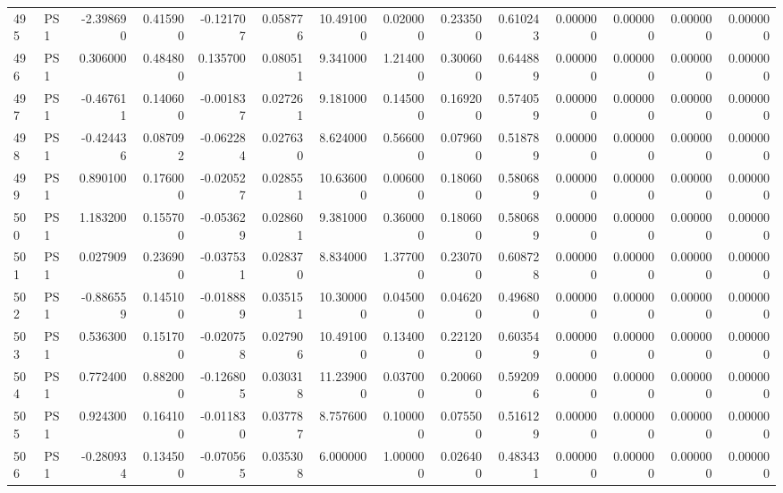 \begin{tabular}{llrrrrrrrrrrrr}
495 &    PS1 & -2.398690 &      0.415900 & -0.121707 &    0.058776 &  10.491000 &      0.020000 &   0.233500 &  0.610243 &  0.000000 &   0.000000 &     0.000000 &     0.000000 \\
496 &    PS1 &  0.306000 &      0.484800 &  0.135700 &    0.080511 &   9.341000 &      1.214000 &   0.300600 &  0.644889 &  0.000000 &   0.000000 &     0.000000 &     0.000000 \\
497 &    PS1 & -0.467611 &      0.140600 & -0.001837 &    0.027261 &   9.181000 &      0.145000 &   0.169200 &  0.574059 &  0.000000 &   0.000000 &     0.000000 &     0.000000 \\
498 &    PS1 & -0.424436 &      0.087092 & -0.062284 &    0.027630 &   8.624000 &      0.566000 &   0.079600 &  0.518789 &  0.000000 &   0.000000 &     0.000000 &     0.000000 \\
499 &    PS1 &  0.890100 &      0.176000 & -0.020527 &    0.028551 &  10.636000 &      0.006000 &   0.180600 &  0.580689 &  0.000000 &   0.000000 &     0.000000 &     0.000000 \\
500 &    PS1 &  1.183200 &      0.155700 & -0.053629 &    0.028601 &   9.381000 &      0.360000 &   0.180600 &  0.580689 &  0.000000 &   0.000000 &     0.000000 &     0.000000 \\
501 &    PS1 &  0.027909 &      0.236900 & -0.037531 &    0.028370 &   8.834000 &      1.377000 &   0.230700 &  0.608728 &  0.000000 &   0.000000 &     0.000000 &     0.000000 \\
502 &    PS1 & -0.886559 &      0.145100 & -0.018889 &    0.035151 &  10.300000 &      0.045000 &   0.046200 &  0.496800 &  0.000000 &   0.000000 &     0.000000 &     0.000000 \\
503 &    PS1 &  0.536300 &      0.151700 & -0.020758 &    0.027906 &  10.491000 &      0.134000 &   0.221200 &  0.603549 &  0.000000 &   0.000000 &     0.000000 &     0.000000 \\
504 &    PS1 &  0.772400 &      0.882000 & -0.126805 &    0.030318 &  11.239000 &      0.037000 &   0.200600 &  0.592096 &  0.000000 &   0.000000 &     0.000000 &     0.000000 \\
505 &    PS1 &  0.924300 &      0.164100 & -0.011830 &    0.037787 &   8.757600 &      0.100000 &   0.075500 &  0.516129 &  0.000000 &   0.000000 &     0.000000 &     0.000000 \\
506 &    PS1 & -0.280934 &      0.134500 & -0.070565 &    0.035308 &   6.000000 &      1.000000 &   0.026400 &  0.483431 &  0.000000 &   0.000000 &     0.000000 &     0.000000 \\

\end{tabular}
